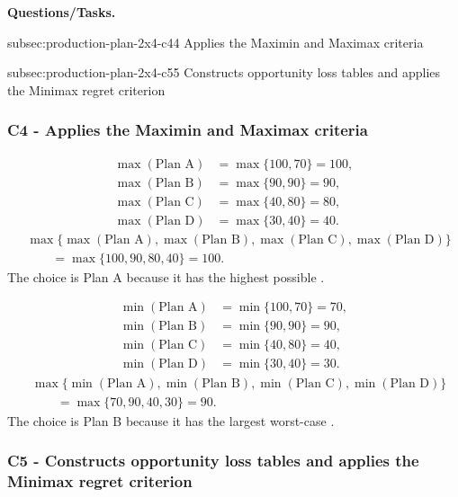 	\textbf{Questions/Tasks.}
	\begin{enumerate}
		\CriterionTask
		{subsec:production-plan-2x4-c4}{4}
		{Applies the Maximin and Maximax criteria}

		\CriterionTask
		{subsec:production-plan-2x4-c5}{5}
		{Constructs opportunity loss tables and applies the Minimax regret criterion}
	\end{enumerate}
	
	\subsubsection*{C4 - Applies the Maximin and Maximax criteria}
	\label{subsec:production-plan-2x4-c4}
	
	\[
	\begin{aligned}
		\max(\text{Plan A}) &= \max\{100,70\}=100,\\
		\max(\text{Plan B}) &= \max\{90,90\}=90,\\
		\max(\text{Plan C}) &= \max\{40,80\}=80,\\
		\max(\text{Plan D}) &= \max\{30,40\}=40.
	\end{aligned}
	\]
	\[
	\begin{aligned}
		&\max\{\max(\text{Plan A}),\max(\text{Plan B}),
		\max(\text{Plan C}),\max(\text{Plan D})\}\\
		&\qquad=\max\{100,90,80,40\}
		=100.
	\end{aligned}
	\]
	The  choice is Plan A because it has the highest possible .
	
	\[
	\begin{aligned}
		\min(\text{Plan A}) &= \min\{100,70\}=70,\\
		\min(\text{Plan B}) &= \min\{90,90\}=90,\\
		\min(\text{Plan C}) &= \min\{40,80\}=40,\\
		\min(\text{Plan D}) &= \min\{30,40\}=30.
	\end{aligned}
	\]
	\[
	\begin{aligned}
		&\max\{\min(\text{Plan A}),\min(\text{Plan B}),
		\min(\text{Plan C}),\min(\text{Plan D})\}\\
		&\qquad=\max\{70,90,40,30\}
		=90.
	\end{aligned}
	\]
	The  choice is Plan B because it has the largest worst-case .
	
	\subsubsection*{C5 - Constructs opportunity loss tables and applies the Minimax regret criterion}
	\label{subsec:production-plan-2x4-c5}
	
